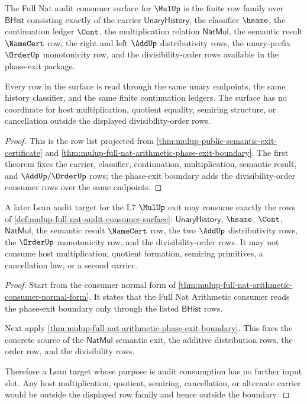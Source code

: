 \begin{definition}
\label{def:mulup-full-nat-audit-consumer-surface}
The Full Nat audit consumer surface for $\MulUp$ is the finite row family over
$\mathsf{BHist}$ consisting exactly of the carrier $\mathsf{UnaryHistory}$,
the classifier $\hsame$, the continuation ledger $\Cont$, the multiplication
relation $\mathsf{NatMul}$, the semantic result $\NameCert$ row, the right and
left $\AddUp$ distributivity rows, the unary-prefix $\OrderUp$ monotonicity
row, and the divisibility-order rows available in the phase-exit package.

Every row in the surface is read through the same unary endpoints, the same
history classifier, and the same finite continuation ledgers. The surface has
no coordinate for host multiplication, quotient equality, semiring structure,
or cancellation outside the displayed divisibility-order rows.
\end{definition}
\begin{proof}
This is the row list projected from
\autoref{thm:mulup-public-semantic-exit-certificate} and
\autoref{thm:mulup-full-nat-arithmetic-phase-exit-boundary}. The first theorem
fixes the carrier, classifier, continuation, multiplication, semantic result,
and $\AddUp/\OrderUp$ rows; the phase-exit boundary adds the divisibility-order
consumer rows over the same endpoints.
\end{proof}

\begin{theorem}
\label{thm:mulup-full-nat-lean-target-boundary}
A later Lean audit target for the L7 $\MulUp$ exit may consume exactly the rows
of \autoref{def:mulup-full-nat-audit-consumer-surface}: $\mathsf{UnaryHistory}$,
$\hsame$, $\Cont$, $\mathsf{NatMul}$, the semantic result $\NameCert$ row, the
two $\AddUp$ distributivity rows, the $\OrderUp$ monotonicity row, and the
divisibility-order rows. It may not consume host multiplication, quotient
formation, semiring primitives, a cancellation law, or a second carrier.
\end{theorem}
\begin{proof}
Start from the consumer normal form of
\autoref{thm:mulup-full-nat-arithmetic-consumer-normal-form}. It states that
the Full Nat Arithmetic consumer reads the phase-exit boundary only through
the listed $\mathsf{BHist}$ rows.

Next apply \autoref{thm:mulup-full-nat-arithmetic-phase-exit-boundary}. This
fixes the concrete source of the $\mathsf{NatMul}$ semantic exit, the additive
distribution rows, the order row, and the divisibility rows.

Therefore a Lean target whose purpose is audit consumption has no further input
slot. Any host multiplication, quotient, semiring, cancellation, or alternate
carrier would be outside the displayed row family and hence outside the
boundary.
\end{proof}

